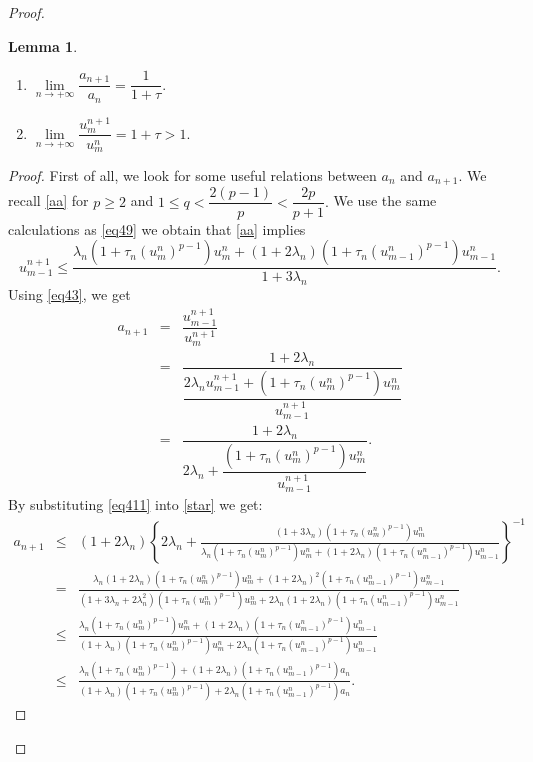 \documentclass[a4paper,12pt,english,reqno]{smfart}
\newtheorem{lem}[th1]{ Lemma}
\begin{document}
\begin{proof}
\begin{lem}
\begin{enumerate}
\begin{enumerate}
					\item $\lim\limits_{n\rightarrow +\infty}\dfrac{a_{n+1}}{a_{n}}=\dfrac{1}{1+\tau}.$
					\item $\lim\limits_{n\rightarrow +\infty}\dfrac{u^{n+1}_{m}}{u^{n}_{m}}=1+\tau>1.$
				\end{enumerate}
			\end{enumerate}
		\end{lem}
		\begin{proof}
			First of all, we look for some useful relations between $a_{n}$ and $a_{n+1}$. We recall \eqref{aa} for $p\geq 2$ and $1\leq q< \dfrac{2(p-1)}{p}<\dfrac{2p}{p+1}.$ We use the same calculations as \eqref{eq49} we obtain that \eqref{aa} implies
			\begin{equation}
			u_{m-1}^{n+1}\leq \frac{\lambda_{n}(1+\tau_{n}(u_{m}^{n})^{p-1})u_{m}^{n}+(1+2\lambda_{n})(1+\tau_{n}(u_{m-1}^{n})^{p-1})u_{m-1}^{n}}{1+3\lambda_{n}}.
			\label{eq411}
			\end{equation}
			Using \eqref{eq43}, we get
			\begin{eqnarray}
			\nonumber a_{n+1}& =&\dfrac{u_{m-1}^{n+1}}{u_{m}^{n+1}} \\
			\nonumber &=& \dfrac{1+2\lambda_{n}}{\dfrac{2\lambda_{n}u_{m-1}^{n+1}+(1+\tau_{n}(u_{m}^{n})^{p-1})u_{m}^{n}}{u_{m-1}^{n+1}}}\\
			&= &\dfrac{1+2\lambda_{n}}{2\lambda_{n}+\dfrac{(1+\tau_{n}(u_{m}^{n})^{p-1})u_{m}^{n}}{u_{m-1}^{n+1}}}.
			\label{star}
			\end{eqnarray}
			By substituting \eqref{eq411} into \eqref{star} we get:
			\begin{eqnarray*}
				a_{n+1}& \leq& (1+2\lambda_{n}) \left\{2\lambda_{n}+\frac{(1+3\lambda_{n})(1+\tau_{n}(u_{m}^{n})^{p-1})u_{m}^{n}}{\lambda_{n}(1+\tau_{n}(u_{m}^{n})^{p-1})u_{m}^{n}+(1+2\lambda_{n})(1+\tau_{n}(u_{m-1}^{n})^{p-1})u_{m-1}^{n}}\right\}^{-1}  \\ 
				& = & \frac{\lambda_{n}(1+2\lambda_{n})(1+\tau_{n}(u_{m}^{n})^{p-1})u_{m}^{n}+(1+2\lambda_{n})^{2}(1+\tau_{n}(u_{m-1}^{n})^{p-1})u_{m-1}^{n}}{(1+3\lambda_{n}+2\lambda_{n}^{2})(1+\tau_{n}(u_{m}^{n})^{p-1})u_{m}^{n}+2\lambda_{n}(1+2\lambda_{n})(1+\tau_{n}(u_{m-1}^{n})^{p-1})u_{m-1}^{n}}\\
				& \leq&
				\frac{\lambda_{n}(1+\tau_{n}(u_{m}^{n})^{p-1})u_{m}^{n}+(1+2\lambda_{n})(1+\tau_{n}(u_{m-1}^{n})^{p-1})u_{m-1}^{n}}{(1+\lambda_{n})(1+\tau_{n}(u_{m}^{n})^{p-1})u_{m}^{n}+2\lambda_{n}(1+\tau_{n}(u_{m-1}^{n})^{p-1})u_{m-1}^{n}}\\
				& \leq&
				\frac{\lambda_{n}(1+\tau_{n}(u_{m}^{n})^{p-1})+(1+2\lambda_{n})(1+\tau_{n}(u_{m-1}^{n})^{p-1})a_{n}}{(1+\lambda_{n})(1+\tau_{n}(u_{m}^{n})^{p-1})+2\lambda_{n}(1+\tau_{n}(u_{m-1}^{n})^{p-1})a_{n}}.

\end{eqnarray*}
\end{proof}
\end{proof}
\end{document}
